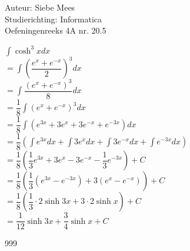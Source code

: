\documentclass[a4paper]{article}
\begin{document}
  
\noindent \large Auteur: Siebe Mees \\
\noindent \large Studierichting: Informatica\\
\noindent \large Oefeningenreeks 4A nr. 20.5\\

\medskip

\normalsize

$ \displaystyle\int \cosh^3 x dx $\\

$ = \displaystyle\int \left(\dfrac{e^x+e^{-x}}{2}\right)^3 dx $\\

$ = \displaystyle\int \dfrac{\left(e^x+e^{-x}\right)^3}{8} dx $\\

$ = \dfrac{1}{8}\displaystyle\int \left(e^x+e^{-x}\right)^3 dx $\\

$ = \dfrac{1}{8}\displaystyle\int \left(e^{3x}+3e^x+3e^{-x}+e^{-3x}\right) dx $\\

$ = \dfrac{1}{8}\left(\displaystyle\int e^{3x} dx + \displaystyle\int 3e^x dx + \displaystyle\int 3e^{-x} dx + \displaystyle\int e^{-3x} dx\right) $\\

$ = \dfrac{1}{8}\left(\dfrac{1}{3}e^{3x}+3e^x-3e^{-x}-\dfrac{1}{3}e^{-3x}\right) + C $\\

$ = \dfrac{1}{8}\left(\dfrac{1}{3}\left(e^{3x}-e^{-3x}\right)+3\left(e^x-e^{-x}\right)\right) + C $\\

$ = \dfrac{1}{8}\left(\dfrac{1}{3}\cdot 2\sinh 3x + 3\cdot 2\sinh x\right) + C $\\

$ = \dfrac{1}{12}\sinh 3x + \dfrac{3}{4}\sinh x + C $\\

\begin{thebibliography}{999}
\end{thebibliography}
\end{document}
